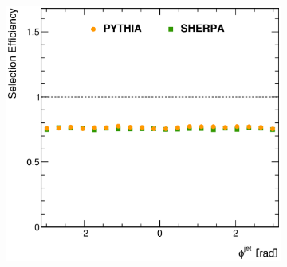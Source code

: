 \documentclass[12pt, twoside]{article}
\numberwithin{equation}{section}
\numberwithin{figure}{section}
\newenvironment{changemargin}[2]{%
\begin{list}{}{%
\setlength{\topsep}{0pt}%
\setlength{\leftmargin}{#1}%
\setlength{\rightmargin}{#2}%
\setlength{\listparindent}{\parindent}%
\setlength{\itemindent}{\parindent}%
\setlength{\parsep}{\parskip}%
}%
\item[]}{\end{list}}
\begin{document}
\begin{figure}
\begin{changemargin}{-1.0cm}{-0.75cm}
\begin{changemargin}{-0.75cm}{-1.0cm}
\begin{subfigure}[b]{0.37\textwidth}
            \subcaption{}
            \label{fig:SelectionEfficienciesRapidityJet}
        \end{subfigure}
        \begin{subfigure}[b]{0.37\textwidth}
            \includegraphics[width=\textwidth]{./images/SelectionEfficiencies/EFF-106.eps}
            \subcaption{}
            \label{fig:SelectionEfficienciesPhiJet}
        \end{subfigure}


\end{changemargin}
\end{changemargin}
\end{figure}
\end{document}
